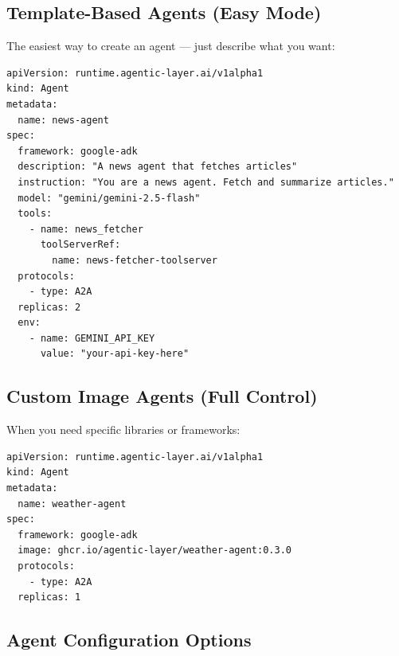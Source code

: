 \documentclass[12pt,a4paper,openany]{report}
\begin{document}
\subsection{Template-Based Agents (Easy Mode)}

The easiest way to create an agent — just describe what you want:

\begin{lstlisting}[style=yaml, caption={A template-based agent}]
apiVersion: runtime.agentic-layer.ai/v1alpha1
kind: Agent
metadata:
  name: news-agent
spec:
  framework: google-adk
  description: "A news agent that fetches articles"
  instruction: "You are a news agent. Fetch and summarize articles."
  model: "gemini/gemini-2.5-flash"
  tools:
    - name: news_fetcher
      toolServerRef:
        name: news-fetcher-toolserver
  protocols:
    - type: A2A
  replicas: 2
  env:
    - name: GEMINI_API_KEY
      value: "your-api-key-here"
\end{lstlisting}

\subsection{Custom Image Agents (Full Control)}

When you need specific libraries or frameworks:

\begin{lstlisting}[style=yaml, caption={A custom image agent}]
apiVersion: runtime.agentic-layer.ai/v1alpha1
kind: Agent
metadata:
  name: weather-agent
spec:
  framework: google-adk
  image: ghcr.io/agentic-layer/weather-agent:0.3.0
  protocols:
    - type: A2A
  replicas: 1
\end{lstlisting}

\subsection{Agent Configuration Options}
\end{document}
